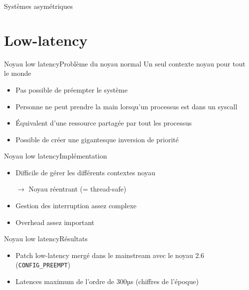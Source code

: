 \begin{frame}{Systèmes asymétriques}
\end{frame} 

\section{Low-latency}

\begin{frame}{Noyau low latency}{Problème du noyau normal} %
 Un seul contexte noyau pour tout le monde
 \begin{itemize}
  \item Pas possible de préempter le système
  \item Personne ne peut prendre la main lorsqu'un processus est dans un syscall
  \item Équivalent d'une ressource partagée par tout les processus
  \item Possible de créer une gigantesque inversion de priorité
 \end{itemize}
\end{frame}

\begin{frame}{Noyau low latency}{Implémentation} %
 \begin{itemize}
  \item Difficile de gérer les différents contextes noyau
  \item[$\to$] Noyau réentrant (= thread-safe)
  \item Gestion des interruption assez complexe
  \item Overhead assez important
 \end{itemize}
\end{frame}

\begin{frame}{Noyau low latency}{Résultats} %
 \begin{itemize}
   \item Patch low-latency mergé dans le mainstream avec le noyau 2.6 (\texttt{CONFIG\_PREEMPT})
   \item Latences maximum de l'ordre de 300µs (chiffres de l'époque)
 \end{itemize}
\end{frame}

